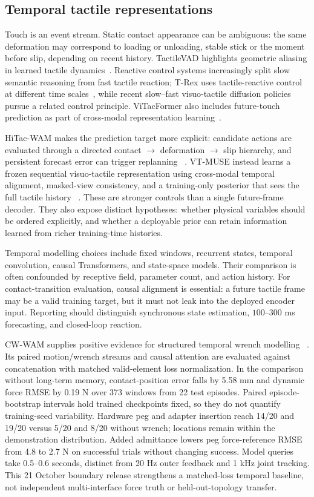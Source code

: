 \subsection{Temporal tactile representations}

Touch is an event stream. Static contact appearance can be ambiguous: the same
deformation may correspond to loading or unloading, stable stick or the moment
before slip, depending on recent history. TactileVAD highlights geometric
aliasing in learned tactile dynamics~\cite{oller2023tactilevad}. Reactive control
systems increasingly split slow semantic reasoning from fast tactile reaction;
T-Rex uses tactile-reactive control at different time scales~\cite{niu2026trex},
while recent slow--fast visuo-tactile diffusion policies pursue a related control
principle. ViTacFormer also includes future-touch prediction as part of
cross-modal representation learning~\cite{heng2025vitacformer}.

HiTac-WAM makes the prediction target more explicit: candidate actions are
evaluated through a directed contact $\rightarrow$ deformation $\rightarrow$ slip
hierarchy, and persistent forecast error can trigger replanning
~\cite{xue2026hitacwam}. VT-MUSE instead learns a frozen sequential
visuo-tactile representation using cross-modal temporal alignment, masked-view
consistency, and a training-only posterior that sees the full tactile history
~\cite{xu2026vtmuse}. These are stronger controls than a single future-frame
decoder. They also expose distinct hypotheses: whether physical variables should
be ordered explicitly, and whether a deployable prior can retain information
learned from richer training-time histories.

Temporal modelling choices include fixed windows, recurrent states, temporal
convolution, causal Transformers, and state-space models. Their comparison is
often confounded by receptive field, parameter count, and action history. For
contact-transition evaluation, causal alignment is essential: a future tactile
frame may be a valid training target, but it must not leak into the deployed
encoder input. Reporting should distinguish synchronous state estimation,
$100$--$300$ ms forecasting, and closed-loop reaction.

CW-WAM supplies positive evidence for structured temporal wrench modelling
~\cite{update2026cwwam}. Its paired motion/wrench streams and causal attention
are evaluated against concatenation with matched valid-element loss
normalization. In the comparison without long-term memory, contact-position
error falls by 5.58 mm and dynamic force RMSE by 0.19 N over 373 windows from
22 test episodes. Paired episode-bootstrap intervals hold trained checkpoints
fixed, so they do not quantify training-seed variability. Hardware peg and adapter
insertion reach 14/20 and 19/20 versus 5/20 and 8/20 without wrench; locations
remain within the demonstration distribution. Added admittance lowers peg
force-reference RMSE from 4.8 to 2.7 N on successful trials without changing
success. Model queries take 0.5--0.6 seconds, distinct from 20 Hz outer feedback
and 1 kHz joint tracking. This 21 October boundary release strengthens a
matched-loss temporal baseline, not independent multi-interface force truth or
held-out-topology transfer.

